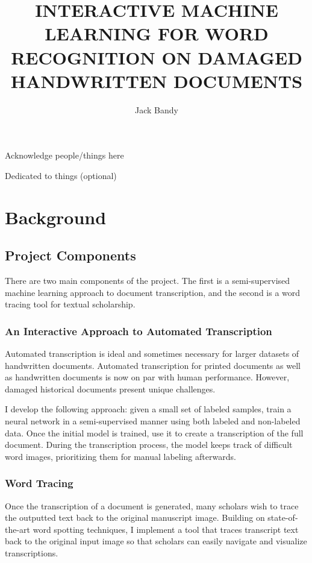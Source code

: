 \documentclass[final]{ukthesis}
\begin{document}
\author{Jack Bandy}
\title{INTERACTIVE MACHINE LEARNING FOR WORD RECOGNITION ON DAMAGED HANDWRITTEN DOCUMENTS}
\frontmatter
\maketitle
\begin{acknowledgments}
Acknowledge people/things here
\end{acknowledgments}
\begin{dedication}
Dedicated to things (optional)
\end{dedication}
\tableofcontents\clearpage
\listoffigures\clearpage
\listoftables\clearpage
\mainmatter
\chapter{Background}
\section{Project Components}
There are two main components of the project. The first is a semi-supervised machine learning approach to document transcription, and the second is a word tracing tool for textual scholarship.

\subsection{An Interactive Approach to Automated Transcription}
Automated transcription is ideal and sometimes necessary for larger datasets of handwritten documents. Automated transcription for printed documents as well as handwritten documents is now on par with human performance. However, damaged historical documents present unique challenges.

I develop the following approach: given a small set of labeled samples, train a neural network in a semi-supervised manner using both labeled and non-labeled data. Once the initial model is trained, use it to create a transcription of the full document. During the transcription process, the model keeps track of difficult word images, prioritizing them for manual labeling afterwards.

\subsection{Word Tracing}
Once the transcription of a document is generated, many scholars wish to trace the outputted text back to the original manuscript image. Building on state-of-the-art word spotting techniques, I implement a tool that traces transcript text back to the original input image so that scholars can easily navigate and visualize transcriptions.
\end{document}
